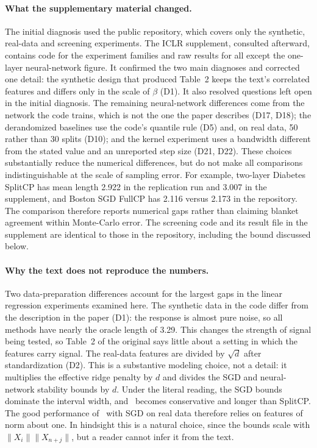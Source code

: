 \paragraph{What the supplementary material changed.} The initial diagnosis used the public repository,
which covers only the synthetic, real-data and screening experiments. The ICLR supplement, consulted afterward,
contains code for the experiment families and raw results for all except the one-layer neural-network figure. It confirmed the two main diagnoses and corrected one detail: the
synthetic design that produced Table~2 keeps the text's correlated features and differs only in the scale of $\beta$
(D1). It also resolved questions left open in the initial diagnosis. The remaining neural-network differences come from the network the
code trains, which is not the one the paper describes (D17, D18); the derandomized baselines use the code's quantile
rule (D5) and, on real data, 50 rather than 30 splits (D10); and the kernel experiment uses a bandwidth different from the stated value and an unreported step
size (D21, D22). These choices substantially reduce the numerical differences, but do not make all comparisons indistinguishable at the scale of sampling error. For example, two-layer Diabetes SplitCP has mean length 2.922 in the replication run and 3.007 in the supplement, and Boston SGD FullCP has 2.116 versus 2.173 in the repository. The comparison therefore reports numerical gaps rather than claiming blanket agreement within Monte-Carlo error. The screening code and its result file in the supplement are identical to those in
the repository, including the bound discussed below.

\paragraph{Why the text does not reproduce the numbers.} Two data-preparation differences account for the largest
gaps in the linear regression experiments examined here. The synthetic data in the code differ from the description in the paper
(D1): the response is almost pure noise, so all methods have nearly the oracle length of 3.29. This changes the strength of signal being tested, so Table~2 of the original says little about a setting in which the features carry
signal. The real-data features are divided by $\sqrt d$ after standardization (D2). This is a substantive modeling
choice, not a detail: it multiplies the effective ridge penalty by $d$ and divides the SGD and neural-network
stability bounds by $d$. Under the literal reading, the SGD bounds dominate the interval width, and \LOO\ becomes
conservative and longer than SplitCP. The good performance of \LOO\ with SGD on real data therefore relies on features
of norm about one. In hindsight this is a natural choice, since the bounds scale with $\|X_i\|\|X_{n+j}\|$, but a
reader cannot infer it from the text.


